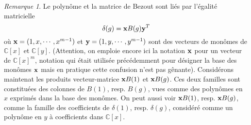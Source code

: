 \documentclass{article}
\theoremstyle{plain}%
\theoremstyle{definition}
\theoremstyle{remark}
\newtheorem*{rem}{Remarque}
\newcommand{\C}{\mathbb{C}}
\begin{document}
\begin{rem}
Le polynôme et la matrice de Bezout sont liés par l'égalité matricielle
\begin{equation}
	\delta(g) = \bold{x} B(g) \bold{y}^T
\end{equation}
où $\bold{x} = (1, x,\cdots, x^{m-1})$ et $\bold{y} = (1, y,\cdots, y^{m-1})$ sont des vecteurs de monômes de $\C[x]$ et $\C[y]$. (Attention, on emploie encore ici la notation ${\bold x}$ pour un vecteur de $\C[x]^m$, notation qui était utilisée précédemment pour désigner la base des monômes ${\bold x}$ mais en pratique cette confusion n'est pas gênante). 
Considérons maintenat les produits vecteur-matrice $\bold{x}B(1)$ et $\bold{x}B(g)$. Ces deux familles sont constituées des colonnes de $B(1)$, resp. $B(g)$, vues comme des polynômes en $x$ exprimés dans la base des monômes. On peut aussi voir $\bold{x}B(1)$, resp. $\bold{x}B(g)$, comme la famille des coefficients de $\delta(1)$, resp. $\delta(g)$, considéré comme un polynôme en $y$ à coefficients dans $\C[x]$.
\end{rem}
\end{document}
